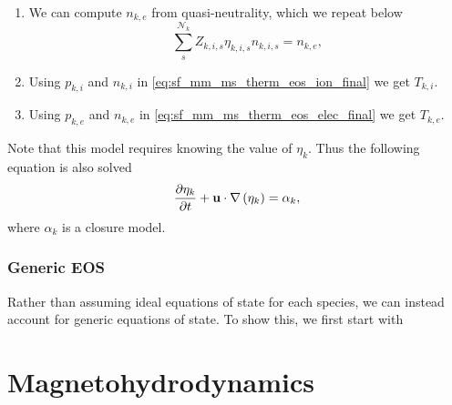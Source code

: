 \documentclass[a4paper,11pt]{report}
\begin{document}
\begin{enumerate}
    \item We can compute $n_{k,e}$ from quasi-neutrality, which we repeat below
    \begin{equation}
        \sum_s^{\mathcal{N}_k} Z_{k,i,s} \eta_{k,i,s} n_{k,i,s} = n_{k,e},
    \end{equation}

    \item Using $p_{k,i}$ and $n_{k,i}$ in \cref{eq:sf_mm_ms_therm_eos_ion_final} we get $T_{k,i}$.

    \item Using $p_{k,e}$ and $n_{k,e}$ in \cref{eq:sf_mm_ms_therm_eos_elec_final} we get $T_{k,e}$.
\end{enumerate}

Note that this model requires knowing the value of $\eta_k$. Thus the following equation is also solved
\begin{equation}
    \frac{\partial \eta_k}{\partial t} + \mathbf{u} \cdot \nabla \left( \eta_k \right) = \alpha_k,
\end{equation}
where $\alpha_k$ is a closure model.

\subsection{Generic EOS}
Rather than assuming ideal equations of state for each species, we can instead account for generic equations of state. To show this, we first start with

\chapter{Magnetohydrodynamics}
\end{document}

